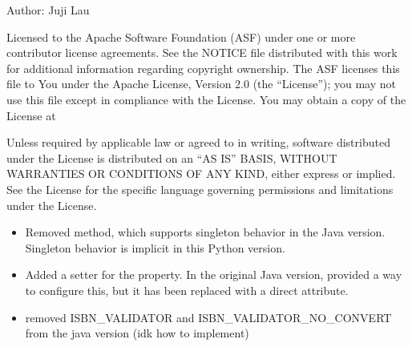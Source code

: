 \documentclass[letterpaper,10pt,english]{sphinxmanual}
\begin{document}
\sphinxAtStartPar
Author: Juji Lau
\begin{description}
\sphinxAtStartPar
Licensed to the Apache Software Foundation (ASF) under one or more contributor license agreements.
See the NOTICE file distributed with this work for additional information regarding copyright ownership.
The ASF licenses this file to You under the Apache License, Version 2.0 (the “License”);
you may not use this file except in compliance with the License. You may obtain a copy of the License at

\sphinxAtStartPar
{}

\sphinxAtStartPar
Unless required by applicable law or agreed to in writing, software distributed under the License is
distributed on an “AS IS” BASIS, WITHOUT WARRANTIES OR CONDITIONS OF ANY KIND, either express or implied.
See the License for the specific language governing permissions and limitations under the License.

\begin{itemize}
\item {} 
\sphinxAtStartPar
Removed  method, which supports singleton behavior in the Java version. Singleton behavior is implicit in this Python version.

\item {} 
\sphinxAtStartPar
Added a setter for the  property. In the original Java version,  provided a way to configure this, but it has been replaced with a direct attribute.

\item {} 
\sphinxAtStartPar
removed ISBN\_VALIDATOR and ISBN\_VALIDATOR\_NO\_CONVERT from the java version (idk how to implement)

\end{itemize}

\end{description}
\end{document}
